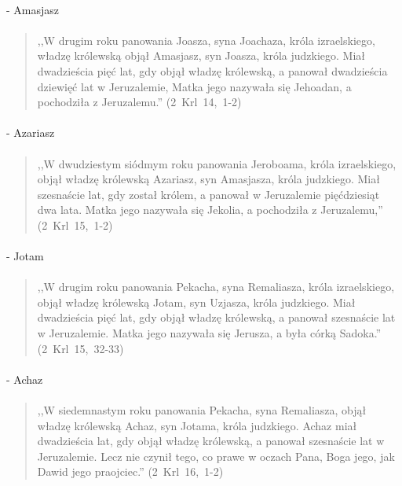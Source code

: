 \documentclass[10pt,a4paper,oneside]{article}
\begin{document}
\paragraph{}
- Amasjasz
\paragraph{}
\begin{quote}
,,W drugim roku panowania Joasza, syna Joachaza, króla izraelskiego, władzę królewską objął Amasjasz, syn Joasza, króla judzkiego. Miał dwadzieścia pięć lat, gdy objął władzę królewską, a panował dwadzieścia dziewięć lat w Jeruzalemie, Matka jego nazywała się Jehoadan, a pochodziła z Jeruzalemu.'' \mbox{(2 Krl 14, 1-2)}
\end{quote}
\paragraph{}
- Azariasz
\paragraph{}
\begin{quote}
,,W dwudziestym siódmym roku panowania Jeroboama, króla izraelskiego, objął władzę królewską Azariasz, syn Amasjasza, króla judzkiego. Miał szesnaście lat, gdy został królem, a panował w Jeruzalemie pięćdziesiąt dwa lata. Matka jego nazywała się Jekolia, a pochodziła z Jeruzalemu,'' \mbox{(2 Krl 15, 1-2)}
\end{quote}
\paragraph{}
- Jotam
\paragraph{}
\begin{quote}
,,W drugim roku panowania Pekacha, syna Remaliasza, króla izraelskiego, objął władzę królewską Jotam, syn Uzjasza, króla judzkiego. Miał dwadzieścia pięć lat, gdy objął władzę królewską, a panował szesnaście lat w Jeruzalemie. Matka jego nazywała się Jerusza, a była córką Sadoka.'' \mbox{(2 Krl 15, 32-33)}
\end{quote}
\paragraph{}
- Achaz
\paragraph{}
\begin{quote}
,,W siedemnastym roku panowania Pekacha, syna Remaliasza, objął władzę królewską Achaz, syn Jotama, króla judzkiego. Achaz miał dwadzieścia lat, gdy objął władzę królewską, a panował szesnaście lat w Jeruzalemie. Lecz nie czynił tego, co prawe w oczach Pana, Boga jego, jak Dawid jego praojciec.'' \mbox{(2 Krl 16, 1-2)}
\end{quote}
\end{document}
